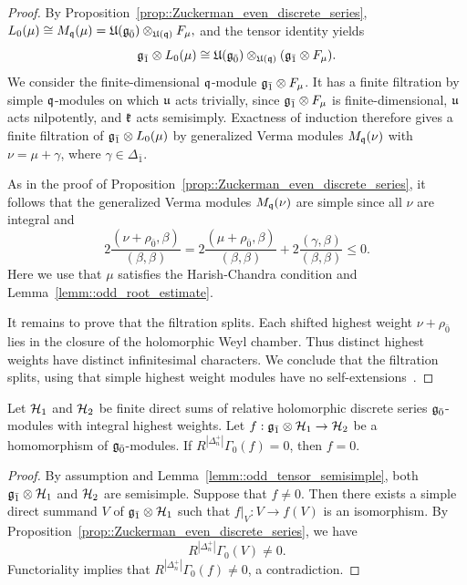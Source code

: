 \begin{proof}
By Proposition~\ref{prop::Zuckerman_even_discrete_series},
$
L_0(\mu)\cong M_{{\mathfrak q}}(\mu)={\mathfrak U}({\mathfrak{g}_{\bar{0}}})\otimes_{{\mathfrak U}({\mathfrak q})}F_{\mu},
$ and the tensor identity yields
\[
{\mathfrak{g}_{\bar{1}}}\otimes L_0(\mu)
\cong
{\mathfrak U}({\mathfrak{g}_{\bar{0}}})\otimes_{{\mathfrak U}({\mathfrak q})}
({\mathfrak{g}_{\bar{1}}}\otimes F_{\mu}).
\]
We consider the finite-dimensional ${\mathfrak q}$-module ${\mathfrak{g}_{\bar{1}}}\otimes F_{\mu}$. It has a finite filtration by simple ${\mathfrak q}$-modules on which ${\mathfrak u}$ acts trivially, since ${\mathfrak{g}_{\bar{1}}}\otimes F_{\mu}$ is finite-dimensional, ${\mathfrak u}$ acts nilpotently, and ${\mathfrak k}$ acts semisimply. Exactness of induction therefore gives a finite filtration of ${\mathfrak{g}_{\bar{1}}}\otimes L_0(\mu)$ by generalized Verma modules $M_{{\mathfrak q}}(\nu)$ with $\nu=\mu+\gamma$, where $\gamma \in \Delta_{\bar{1}}$.

As in the proof of Proposition~\ref{prop::Zuckerman_even_discrete_series}, it follows that the generalized Verma modules $M_{{\mathfrak q}}(\nu)$ are simple since all $\nu$ are integral and 
\[
2\frac{(\nu+\rho_{\bar0},\beta)}{(\beta,\beta)}
=
2\frac{(\mu+\rho_{\bar0},\beta)}{(\beta,\beta)}
+
2\frac{(\gamma,\beta)}{(\beta,\beta)}
\leq0.
\]
Here we use that $\mu$ satisfies the Harish-Chandra condition and Lemma~\ref{lemm::odd_root_estimate}.

It remains to prove that the filtration splits. Each shifted highest weight
$\nu+\rho_{\bar0}$ lies in the closure of the holomorphic Weyl chamber.
Thus distinct highest weights have distinct infinitesimal characters.
We conclude that the filtration splits, using that simple highest weight modules have no self-extensions~\cite[Proposition~3.1(d)]{humphreys2008representations}.
\end{proof}


\begin{lemma}
\label{lemm::Zuckerman_detects_odd_maps}
Let ${\mathcal{H}}_{1}$ and ${\mathcal{H}}_{2}$ be finite direct sums of relative holomorphic discrete series ${\mathfrak{g}_{\bar{0}}}$-modules with integral highest weights. Let 
$
f:{\mathfrak{g}_{\bar{1}}}\otimes {\mathcal{H}}_{1}\to {\mathcal{H}}_{2}
$ be a homomorphism of ${\mathfrak{g}_{\bar{0}}}$-modules. If $R^{|\Delta_n^+|}\Gamma_0(f)=0$, then $f=0$. 
\end{lemma}

\begin{proof}
By assumption and Lemma~\ref{lemm::odd_tensor_semisimple}, both ${\mathfrak{g}_{\bar{1}}}\otimes{\mathcal{H}}_{1}$ and ${\mathcal{H}}_{2}$ are semisimple. Suppose that $f\neq0$. Then there exists a simple direct summand $V$ of ${\mathfrak{g}_{\bar{1}}}\otimes{\mathcal{H}}_{1}$ such that $f\vert_V\colon V\to f(V)$ is an isomorphism. By Proposition~\ref{prop::Zuckerman_even_discrete_series}, we have
\[
R^{|\Delta_n^+|}\Gamma_0(V)\neq0.
\]
Functoriality implies that $R^{|\Delta_n^+|}\Gamma_0(f)\neq0$, a contradiction.
\end{proof}

